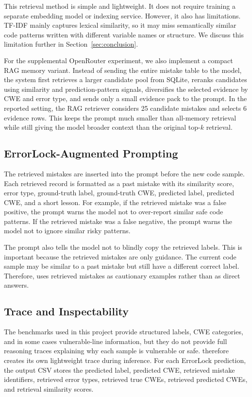 This retrieval method is simple and lightweight. It does not require training a separate embedding model or indexing service. However, it also has limitations. TF-IDF mainly captures lexical similarity, so it may miss semantically similar code patterns written with different variable names or structure. We discuss this limitation further in Section~\ref{sec:conclusion}.

For the supplemental OpenRouter experiment, we also implement a compact RAG memory variant. Instead of sending the entire mistake table to the model, the system first retrieves a larger candidate pool from SQLite, reranks candidates using similarity and prediction-pattern signals, diversifies the selected evidence by CWE and error type, and sends only a small evidence pack to the prompt. In the reported setting, the RAG retriever considers 25 candidate mistakes and selects 6 evidence rows. This keeps the prompt much smaller than all-memory retrieval while still giving the model broader context than the original top-$k$ retrieval.

\subsection{ErrorLock-Augmented Prompting}

The retrieved mistakes are inserted into the prompt before the new code sample. Each retrieved record is formatted as a past mistake with its similarity score, error type, ground-truth label, ground-truth CWE, predicted label, predicted CWE, and a short lesson. For example, if the retrieved mistake was a false positive, the prompt warns the model not to over-report similar safe code patterns. If the retrieved mistake was a false negative, the prompt warns the model not to ignore similar risky patterns.

The prompt also tells the model not to blindly copy the retrieved labels. This is important because the retrieved mistakes are only guidance. The current code sample may be similar to a past mistake but still have a different correct label. Therefore, \system uses retrieved mistakes as cautionary examples rather than as direct answers.

\subsection{Trace and Inspectability}

The benchmarks used in this project provide structured labels, CWE categories, and in some cases vulnerable-line information, but they do not provide full reasoning traces explaining why each sample is vulnerable or safe. \system therefore creates its own lightweight trace during inference. For each ErrorLock prediction, the output CSV stores the predicted label, predicted CWE, retrieved mistake identifiers, retrieved error types, retrieved true CWEs, retrieved predicted CWEs, and retrieval similarity scores.

